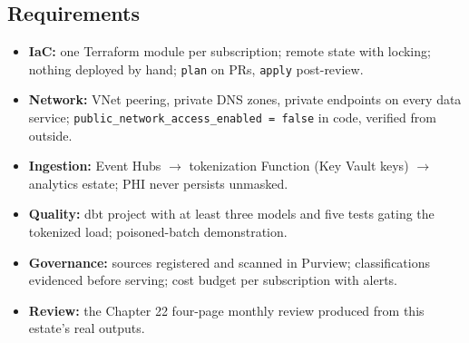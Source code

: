 \subsection*{Requirements}
\begin{itemize}
    \item \textbf{IaC:} one Terraform module per subscription; remote state with locking; nothing deployed by hand; \texttt{plan} on PRs, \texttt{apply} post-review.
    \item \textbf{Network:} VNet peering, private DNS zones, private endpoints on every data service; \texttt{public\_network\_access\_enabled = false} in code, verified from outside.
    \item \textbf{Ingestion:} Event Hubs $\rightarrow$ tokenization Function (Key Vault keys) $\rightarrow$ analytics estate; PHI never persists unmasked.
    \item \textbf{Quality:} dbt project with at least three models and five tests gating the tokenized load; poisoned-batch demonstration.
    \item \textbf{Governance:} sources registered and scanned in Purview; classifications evidenced before serving; cost budget per subscription with alerts.
    \item \textbf{Review:} the Chapter 22 four-page monthly review produced from this estate's real outputs.
\end{itemize}

